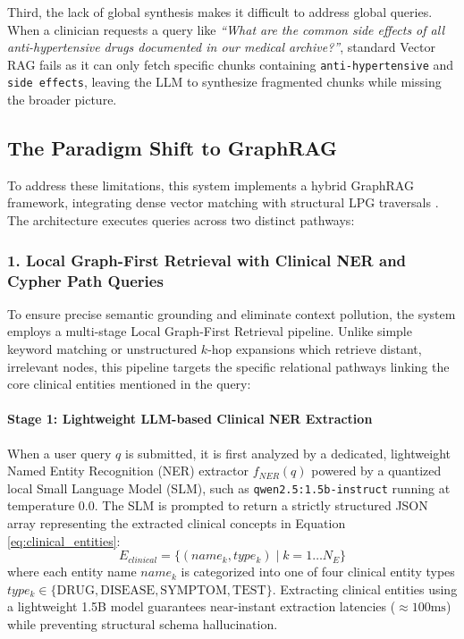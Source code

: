 \documentclass[../main.tex]{subfiles}
\begin{document}
Third, the lack of global synthesis makes it difficult to address global queries. When a clinician requests a query like \textit{``What are the common side effects of all anti-hypertensive drugs documented in our medical archive?''}, standard Vector RAG fails as it can only fetch specific chunks containing \texttt{anti-hypertensive} and \texttt{side effects}, leaving the LLM to synthesize fragmented chunks while missing the broader picture.

\subsection{The Paradigm Shift to GraphRAG}

To address these limitations, this system implements a hybrid GraphRAG framework, integrating dense vector matching with structural LPG traversals \cite{edge2024from}. The architecture executes queries across two distinct pathways:

\subsubsection{1. Local Graph-First Retrieval with Clinical NER and Cypher Path Queries}

To ensure precise semantic grounding and eliminate context pollution, the system employs a multi-stage Local Graph-First Retrieval pipeline. Unlike simple keyword matching or unstructured $k$-hop expansions which retrieve distant, irrelevant nodes, this pipeline targets the specific relational pathways linking the core clinical entities mentioned in the query:

\paragraph{Stage 1: Lightweight LLM-based Clinical NER Extraction}
When a user query $q$ is submitted, it is first analyzed by a dedicated, lightweight Named Entity Recognition (NER) extractor $f_{NER}(q)$ powered by a quantized local Small Language Model (SLM), such as \texttt{qwen2.5:1.5b-instruct} running at temperature $0.0$. The SLM is prompted to return a strictly structured JSON array representing the extracted clinical concepts in Equation \eqref{eq:clinical_entities}:
\begin{equation}\label{eq:clinical_entities}
E_{clinical} = \{ (name_k, type_k) \mid k = 1 \dots N_E \}
\end{equation}
where each entity name $name_k$ is categorized into one of four clinical entity types $type_k \in \{ \text{DRUG}, \text{DISEASE}, \text{SYMPTOM}, \text{TEST} \}$. Extracting clinical entities using a lightweight 1.5B model guarantees near-instant extraction latencies ($\approx 100\text{ms}$) while preventing structural schema hallucination.
\end{document}
